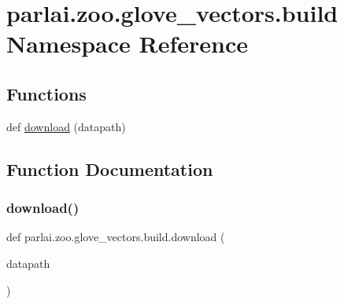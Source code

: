 \hypertarget{namespaceparlai_1_1zoo_1_1glove__vectors_1_1build}{}\section{parlai.\+zoo.\+glove\+\_\+vectors.\+build Namespace Reference}
\label{namespaceparlai_1_1zoo_1_1glove__vectors_1_1build}
\subsection*{Functions}
\begin{DoxyCompactItemize}
\item 
def \hyperlink{namespaceparlai_1_1zoo_1_1glove__vectors_1_1build_a125629618a62d8b36813296c76e9cf8b}{download} (datapath)
\end{DoxyCompactItemize}


\subsection{Function Documentation}
\mbox{\label{namespaceparlai_1_1zoo_1_1glove__vectors_1_1build_a125629618a62d8b36813296c76e9cf8b}} 
\subsubsection{\texorpdfstring{download()}{download()}}
{\footnotesize\ttfamily def parlai.\+zoo.\+glove\+\_\+vectors.\+build.\+download (\begin{DoxyParamCaption}\item[{}]{datapath }\end{DoxyParamCaption})}

